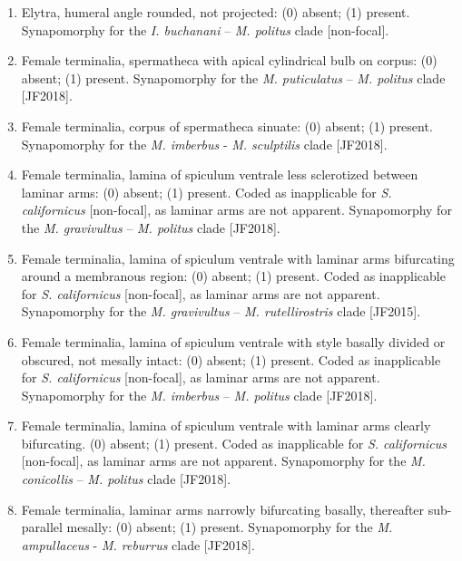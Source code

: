 \documentclass[fleqn,10pt,lineno]{wlpeerj} %
\begin{document}
\begin{enumerate}
		\item Elytra, humeral angle rounded, not projected: (0) absent; (1) present. Synapomorphy for the \textit{I. buchanani} – \textit{M. politus} clade [non-focal].
		
		\item Female terminalia, spermatheca with apical cylindrical bulb on corpus: (0) absent; (1) present. Synapomorphy for the \textit{M. puticulatus} – \textit{M. politus} clade [JF2018].
		
		\item Female terminalia, corpus of spermatheca sinuate: (0) absent; (1) present. Synapomorphy for the \textit{M. imberbus} - \textit{M. sculptilis} clade [JF2018].
		
		\item Female terminalia, lamina of spiculum ventrale less sclerotized between laminar arms: (0) absent; (1) present. Coded as inapplicable for \textit{S. californicus} [non-focal], as laminar arms are not apparent. Synapomorphy for the \textit{M. gravivultus} – \textit{M. politus} clade [JF2018].
		
		\item Female terminalia, lamina of spiculum ventrale with laminar arms bifurcating around a membranous region: (0) absent; (1) present. Coded as inapplicable for \textit{S. californicus} [non-focal], as laminar arms are not apparent. Synapomorphy for the \textit{M. gravivultus} – \textit{M. rutellirostris} clade [JF2015].
		
		\item Female terminalia, lamina of spiculum ventrale with style basally divided or obscured, not mesally intact: (0) absent; (1) present. Coded as inapplicable for \textit{S. californicus} [non-focal], as laminar arms are not apparent. Synapomorphy for the \textit{M. imberbus} – \textit{M. politus} clade [JF2018].
		
		\item Female terminalia, lamina of spiculum ventrale with laminar arms clearly bifurcating. (0) absent; (1) present. Coded as inapplicable for \textit{S. californicus} [non-focal], as laminar arms are not apparent. Synapomorphy for the \textit{M. conicollis} – \textit{M. politus} clade [JF2018].
		
		\item Female terminalia, laminar arms narrowly bifurcating basally, thereafter sub-parallel mesally: (0) absent; (1) present. Synapomorphy for the \textit{M. ampullaceus} - \textit{M. reburrus} clade [JF2018].
		

\end{enumerate}
\end{document}
